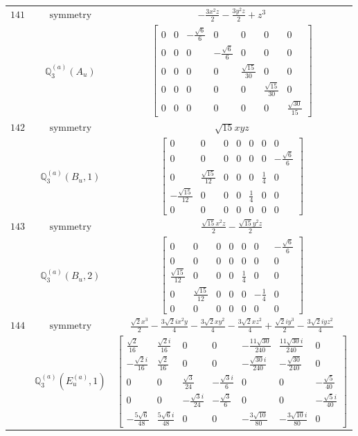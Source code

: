 \documentclass[fleqn,8pt,landscape]{jsarticle}
\begin{document}
\begin{longtable}{ccc}
$ 141 $ & $ \text{symmetry} $ & $ - \frac{3 x^{2} z}{2} - \frac{3 y^{2} z}{2} + z^{3} $ \\
$  $ & $ \mathbb{Q}_{3}^{(a)}(A_{u}) $ & $ \begin{bmatrix} 0 & 0 & - \frac{\sqrt{6}}{6} & 0 & 0 & 0 & 0 \\ 0 & 0 & 0 & - \frac{\sqrt{6}}{6} & 0 & 0 & 0 \\ 0 & 0 & 0 & 0 & \frac{\sqrt{15}}{30} & 0 & 0 \\ 0 & 0 & 0 & 0 & 0 & \frac{\sqrt{15}}{30} & 0 \\ 0 & 0 & 0 & 0 & 0 & 0 & \frac{\sqrt{30}}{15} \end{bmatrix} $ \\ \hline
$ 142 $ & $ \text{symmetry} $ & $ \sqrt{15} x y z $ \\
$  $ & $ \mathbb{Q}_{3}^{(a)}(B_{u},1) $ & $ \begin{bmatrix} 0 & 0 & 0 & 0 & 0 & 0 & 0 \\ 0 & 0 & 0 & 0 & 0 & 0 & - \frac{\sqrt{6}}{6} \\ 0 & \frac{\sqrt{15}}{12} & 0 & 0 & 0 & \frac{1}{4} & 0 \\ - \frac{\sqrt{15}}{12} & 0 & 0 & 0 & \frac{1}{4} & 0 & 0 \\ 0 & 0 & 0 & 0 & 0 & 0 & 0 \end{bmatrix} $ \\ \hline
$ 143 $ & $ \text{symmetry} $ & $ \frac{\sqrt{15} x^{2} z}{2} - \frac{\sqrt{15} y^{2} z}{2} $ \\
$  $ & $ \mathbb{Q}_{3}^{(a)}(B_{u},2) $ & $ \begin{bmatrix} 0 & 0 & 0 & 0 & 0 & 0 & - \frac{\sqrt{6}}{6} \\ 0 & 0 & 0 & 0 & 0 & 0 & 0 \\ \frac{\sqrt{15}}{12} & 0 & 0 & 0 & \frac{1}{4} & 0 & 0 \\ 0 & \frac{\sqrt{15}}{12} & 0 & 0 & 0 & - \frac{1}{4} & 0 \\ 0 & 0 & 0 & 0 & 0 & 0 & 0 \end{bmatrix} $ \\ \hline
$ 144 $ & $ \text{symmetry} $ & $ \frac{\sqrt{2} x^{3}}{2} - \frac{3 \sqrt{2} i x^{2} y}{4} - \frac{3 \sqrt{2} x y^{2}}{4} - \frac{3 \sqrt{2} x z^{2}}{4} + \frac{\sqrt{2} i y^{3}}{2} - \frac{3 \sqrt{2} i y z^{2}}{4} $ \\
$  $ & $ \mathbb{Q}_{3}^{(a)}(E_{u}^{(a)},1) $ & $ \begin{bmatrix} \frac{\sqrt{2}}{16} & \frac{\sqrt{2} i}{16} & 0 & 0 & - \frac{11 \sqrt{30}}{240} & \frac{11 \sqrt{30} i}{240} & 0 \\ - \frac{\sqrt{2} i}{16} & \frac{\sqrt{2}}{16} & 0 & 0 & - \frac{\sqrt{30} i}{240} & - \frac{\sqrt{30}}{240} & 0 \\ 0 & 0 & \frac{\sqrt{3}}{24} & - \frac{\sqrt{3} i}{6} & 0 & 0 & - \frac{\sqrt{5}}{40} \\ 0 & 0 & - \frac{\sqrt{3} i}{24} & - \frac{\sqrt{3}}{6} & 0 & 0 & - \frac{\sqrt{5} i}{40} \\ - \frac{5 \sqrt{6}}{48} & \frac{5 \sqrt{6} i}{48} & 0 & 0 & - \frac{3 \sqrt{10}}{80} & - \frac{3 \sqrt{10} i}{80} & 0 \end{bmatrix} $ \\ \hline

\end{longtable}
\end{document}
